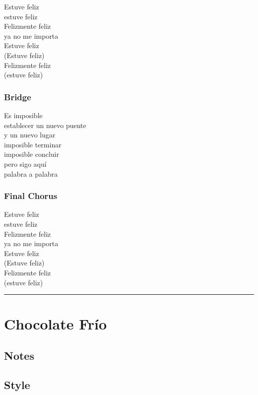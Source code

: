 Estuve feliz\\
estuve feliz\\
Felizmente feliz\\
ya no me importa\\
Estuve feliz\\
(Estuve feliz)\\
Felizmente feliz\\
(estuve feliz)

\subsubsection{Bridge}\label{bridge-14}

Es imposible\\
establecer un nuevo puente\\
y un nuevo lugar\\
imposible terminar\\
imposible concluir\\
pero sigo aquí\\
palabra a palabra

\subsubsection{Final Chorus}\label{final-chorus}

Estuve feliz\\
estuve feliz\\
Felizmente feliz\\
ya no me importa\\
Estuve feliz\\
(Estuve feliz)\\
Felizmente feliz\\
(estuve feliz)

\begin{center}\rule{0.5\linewidth}{0.5pt}\end{center}

\section{Chocolate Frío}\label{chocolate-fruxedo}

\subsection{Notes}\label{notes-35}

\subsection{Style}\label{style-34}

